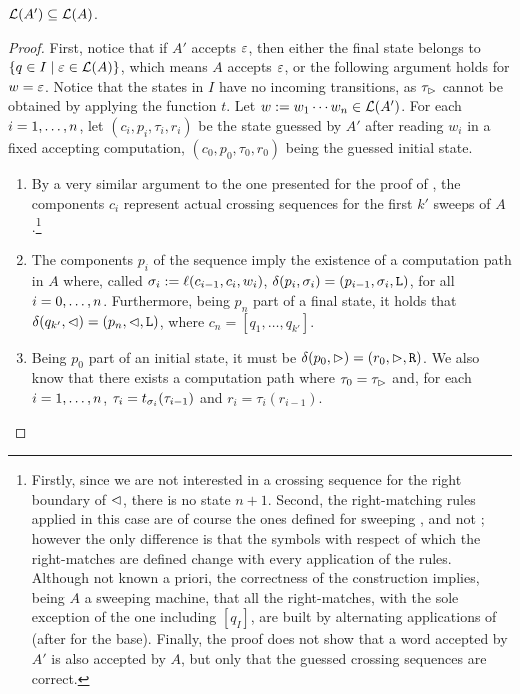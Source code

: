\begin{lemm}\label{lem:swkLAtoNFA-2}
	$\mathcal L(A')\subseteq\mathcal L(A)$.
\end{lemm}
\begin{proof}
	First, notice that if $A'$ accepts $\varepsilon$, then either the final state belongs to $\{q\in I\mid \varepsilon\in\mathcal L(A)\}$, which means $A$ accepts $\varepsilon$, or the following argument holds for $w=\varepsilon$.
	Notice that the states in $I$ have no incoming transitions, as $\tau_\rhd$ cannot be obtained by applying the function $t$.
	Let $w:=w_1\cdots w_n\in\mathcal L(A')$. For each $i=1,\dots,n$, let $(c_i,p_i,\tau_i,r_i)$ be the state guessed by $A'$ after reading $w_i$ in a fixed accepting computation, $(c_0,p_0,\tau_0,r_0)$ being the guessed initial state.
	\begin{enumerate}
		\item By a very similar argument to the one presented for the proof of , the components $c_i$ represent actual crossing sequences for the first $k'$ sweeps of $A$.\footnote{%
			      Firstly, since we are not interested in a crossing sequence for the right boundary of $\lhd$, there is no state $n+1$.
			      Second, the right-matching rules applied in this case are of course the ones defined for sweeping \kDLAs, and not \TDFAs; however the only difference is that the symbols with respect of which the right-matches are defined change with every application of the rules.
			      Although not known a priori, the correctness of the construction implies, being $A$ a sweeping machine, that all the right-matches, with the sole exception of the one including $[q_I]$, are built by alternating applications of  (after  for the base).
			      Finally, the proof does not show that a word accepted by $A'$ is also accepted by $A$, but only that the guessed crossing sequences are correct.}
		\item The components $p_i$ of the sequence imply the existence of a computation path in $A$ where, called $\sigma_i:=\ell(c_{i-1},c_i,w_i)$, $\delta(p_i,\sigma_i)=(p_{i-1},\sigma_i,\mathtt L)$, for all $i=0,\dots,n$.
		      Furthermore, being $p_n$ part of a final state, it holds that $\delta(q_{k'},\lhd)=(p_n,\lhd,\mathtt L)$, where $c_n=[q_1,\dots,q_{k'}]$.
		\item Being $p_0$ part of an initial state, it must be $\delta(p_0,\rhd)=(r_0,\rhd,\mathtt R)$.
		      We also know that there exists a computation path where $\tau_0=\tau_\rhd$ and, for each $i=1,\dots,n$, $\tau_i=t_{\sigma_i}(\tau_{i-1})$ and $r_i=\tau_i(r_{i-1})$.

\end{enumerate}
\end{proof}
